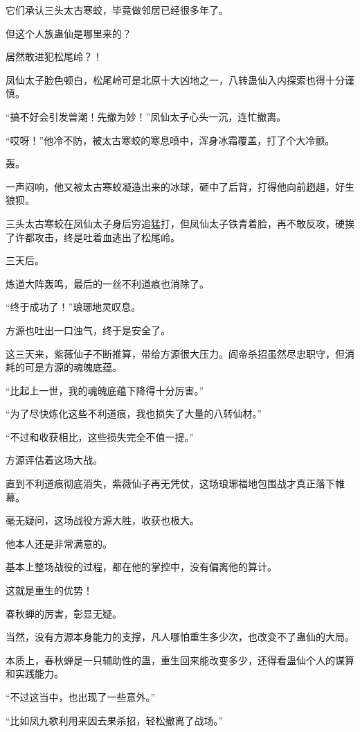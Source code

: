 \begin{this_body}
它们承认三头太古寒蛟，毕竟做邻居已经很多年了。

但这个人族蛊仙是哪里来的？

居然敢进犯松尾岭？！

凤仙太子脸色顿白，松尾岭可是北原十大凶地之一，八转蛊仙入内探索也得十分谨慎。

“搞不好会引发兽潮！先撤为妙！”凤仙太子心头一沉，连忙撤离。

“哎呀！”他冷不防，被太古寒蛟的寒息喷中，浑身冰霜覆盖，打了个大冷颤。

轰。

一声闷响，他又被太古寒蛟凝造出来的冰球，砸中了后背，打得他向前趔趄，好生狼狈。

三头太古寒蛟在凤仙太子身后穷追猛打，但凤仙太子铁青着脸，再不敢反攻，硬挨了许都攻击，终是吐着血逃出了松尾岭。

三天后。

炼道大阵轰鸣，最后的一丝不利道痕也消除了。

“终于成功了！”琅琊地灵叹息。

方源也吐出一口浊气，终于是安全了。

这三天来，紫薇仙子不断推算，带给方源很大压力。阎帝杀招虽然尽忠职守，但消耗的可是方源的魂魄底蕴。

“比起上一世，我的魂魄底蕴下降得十分厉害。”

“为了尽快炼化这些不利道痕，我也损失了大量的八转仙材。”

“不过和收获相比，这些损失完全不值一提。”

方源评估着这场大战。

直到不利道痕彻底消失，紫薇仙子再无凭仗，这场琅琊福地包围战才真正落下帷幕。

毫无疑问，这场战役方源大胜，收获也极大。

他本人还是非常满意的。

基本上整场战役的过程，都在他的掌控中，没有偏离他的算计。

这就是重生的优势！

春秋蝉的厉害，彰显无疑。

当然，没有方源本身能力的支撑，凡人哪怕重生多少次，也改变不了蛊仙的大局。

本质上，春秋蝉是一只辅助性的蛊，重生回来能改变多少，还得看蛊仙个人的谋算和实践能力。

“不过这当中，也出现了一些意外。”

“比如凤九歌利用来因去果杀招，轻松撤离了战场。”


\end{this_body}
